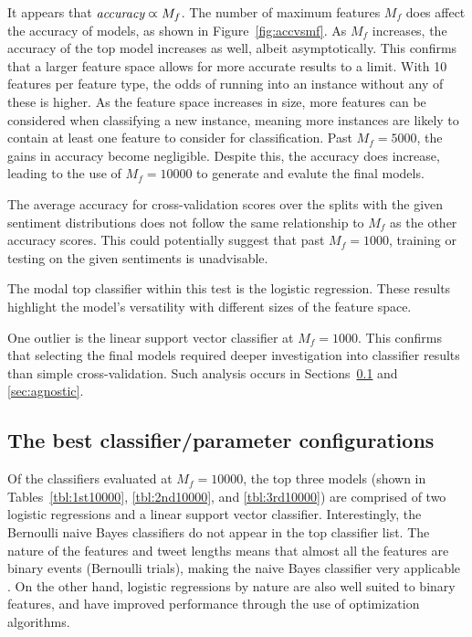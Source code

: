 \documentclass[11pt]{article}
\begin{document}
It appears that $\emph{accuracy} \varpropto M_f$.
The number of maximum features $M_f$ does affect the accuracy of models, as shown in Figure~\ref{fig:accvsmf}.
As $M_f$ increases, the accuracy of the top model increases as well, albeit asymptotically.
This confirms that a larger feature space allows for more accurate results to a limit.
With 10 features per feature type, the odds of running into an instance without any of these is higher. 
As the feature space increases in size, more features can be considered when classifying a new instance, 
meaning more instances are likely to contain at least one feature to consider for classification.
Past $M_f = 5000$, the gains in accuracy become negligible.
Despite this, the accuracy does increase, 
leading to the use of $M_f = 10000$ to generate and evalute the final models.


The average accuracy for cross-validation scores over the splits with the given sentiment distributions does not follow the same relationship to $M_f$ as the other accuracy scores.
This could potentially suggest that past $M_f = 1000$, training or testing on the given sentiments is unadvisable.



The modal top classifier within this test is the logistic regression.
These results highlight the model's versatility with different sizes of the feature space.


One outlier is the linear support vector classifier at $M_f = 1000$. 
This confirms that selecting the final models required deeper investigation into classifier results than simple cross-validation.
Such analysis occurs in Sections~\ref{sec:bestparams} and \ref{sec:agnostic}.

\subsection{The best classifier/parameter configurations}\label{sec:bestparams}


Of the classifiers evaluated at $M_f = 10000$, 
the top three models (shown in Tables~\ref{tbl:1st10000}, \ref{tbl:2nd10000}, and \ref{tbl:3rd10000}) are comprised of two logistic regressions and a linear support vector classifier.
Interestingly, the Bernoulli naive Bayes classifiers do not appear in the top classifier list.
The nature of the features and tweet lengths means that almost all the features are binary events (Bernoulli trials),
making the naive Bayes classifier very applicable \cite{tweetlen}. 
On the other hand, logistic regressions by nature are also well suited to binary features,
and have improved performance through the use of optimization algorithms.
\end{document}

